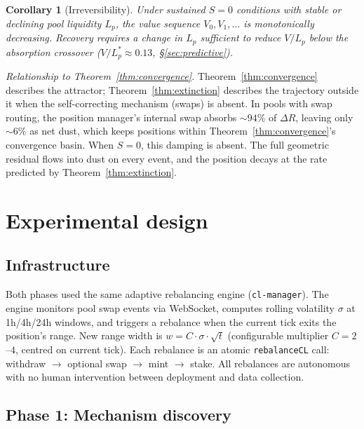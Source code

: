 \documentclass[11pt,a4paper]{article}
\newtheorem*{corollary}{Corollary}
\begin{document}
\begin{corollary}[Irreversibility]\label{cor:irreversibility}
Under sustained $S = 0$ conditions with stable or declining pool liquidity $L_p$, the value sequence $V_0, V_1, \ldots$ is monotonically decreasing. Recovery requires a change in $L_p$ sufficient to reduce $V/L_p$ below the absorption crossover ($V/L_p^* \approx 0.13$, \S\ref{sec:predictive}).
\end{corollary}

\emph{Relationship to Theorem~\ref{thm:convergence}.} Theorem~\ref{thm:convergence} describes the attractor; Theorem~\ref{thm:extinction} describes the trajectory outside it when the self-correcting mechanism (swaps) is absent. In pools with swap routing, the position manager's internal swap absorbs ${\sim}94\%$ of $\Delta R$, leaving only ${\sim}6\%$ as net dust, which keeps positions within Theorem~\ref{thm:convergence}'s convergence basin. When $S = 0$, this damping is absent. The full geometric residual flows into dust on every event, and the position decays at the rate predicted by Theorem~\ref{thm:extinction}.

\section{Experimental design}\label{sec:experimental}

\subsection{Infrastructure}\label{sec:infrastructure}

Both phases used the same adaptive rebalancing engine (\texttt{cl-manager}). The engine monitors pool swap events via WebSocket, computes rolling volatility $\sigma$ at 1h/4h/24h windows, and triggers a rebalance when the current tick exits the position's range. New range width is $w = C \cdot \sigma \cdot \sqrt{t}$ (configurable multiplier $C = 2$--$4$, centred on current tick). Each rebalance is an atomic \texttt{rebalanceCL} call: withdraw $\to$ optional swap $\to$ mint $\to$ stake. All rebalances are autonomous with no human intervention between deployment and data collection.

\subsection{Phase 1: Mechanism discovery}\label{sec:phase1}
\end{document}
